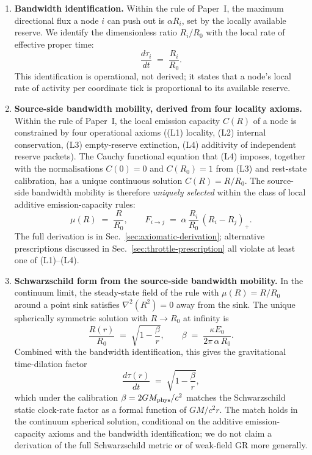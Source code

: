 \documentclass[11pt,a4paper]{article}
\begin{document}
\begin{enumerate}
\item \textbf{Bandwidth identification.} Within the rule of
Paper~I, the maximum directional flux a node $i$ can push out
is $\alpha R_i$, set by the locally available reserve. We
identify the dimensionless ratio $R_i/R_0$ with the local rate
of effective proper time:
\[
\frac{d\tau_i}{dt} \;=\; \frac{R_i}{R_0}.
\]
This identification is operational, not derived; it states
that a node's local rate of activity per coordinate tick is
proportional to its available reserve.

\item \textbf{Source-side bandwidth mobility, derived from
four locality axioms.} Within the rule of Paper~I, the local
emission capacity $C(R)$ of a node is constrained by four
operational axioms ((L1) locality, (L2) internal conservation,
(L3) empty-reserve extinction, (L4) additivity of independent
reserve packets). The Cauchy functional equation that (L4)
imposes, together with the normalisations $C(0)=0$ and
$C(R_0)=1$ from (L3) and rest-state calibration, has a unique
continuous solution $C(R) = R/R_0$. The source-side bandwidth
mobility is therefore \emph{uniquely selected} within the class
of local additive emission-capacity rules:
\[
\mu(R) \;=\; \frac{R}{R_0}, \qquad
F_{i \to j} \;=\; \alpha\, \frac{R_i}{R_0}\, (R_i - R_j)_+.
\]
The full derivation is in Sec.~\ref{sec:axiomatic-derivation};
alternative prescriptions discussed in
Sec.~\ref{sec:throttle-prescription} all violate at least one
of (L1)--(L4).

\item \textbf{Schwarzschild form from the source-side
bandwidth mobility.} In the continuum limit, the steady-state
field of the rule with $\mu(R) = R/R_0$ around a point sink
satisfies $\nabla^2(R^2) = 0$ away from the sink.
The unique spherically symmetric solution with $R \to R_0$ at
infinity is
\[
\frac{R(r)}{R_0} \;=\; \sqrt{1 - \frac{\beta}{r}},
\qquad
\beta \;=\; \frac{\kappa E_0}{2\pi\,\alpha\, R_0}.
\]
Combined with the bandwidth identification, this gives the
gravitational time-dilation factor
\[
\frac{d\tau(r)}{dt} \;=\; \sqrt{1 - \frac{\beta}{r}},
\]
which under the calibration $\beta = 2GM_{\rm phys}/c^2$
matches the Schwarzschild static clock-rate factor as a
formal function of $GM/c^2 r$. The match holds in the
continuum spherical solution, conditional on the
additive emission-capacity axioms and the bandwidth
identification; we do not claim a
derivation of the full Schwarzschild metric or of weak-field
GR more generally.
\end{enumerate}
\end{document}
